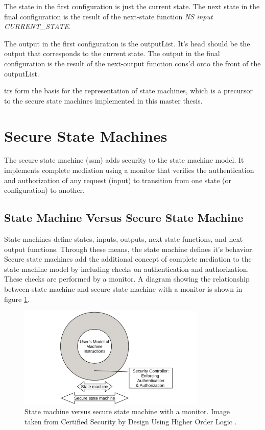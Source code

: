\documentclass[../../main/main.tex]{subfiles}
\begin{document}
The state in the first configuration is just the current state.  The next state in the final configuration is the result of the next-state function \textit{NS input CURRENT_STATE}.

The output in the first configuration is the outputList.  It's head should be the output that corresponds to the current state.  The output in the final configuration is the result of the next-output function cons'd onto the front of the outputList.

\glspl{tr} form the basis for the  representation of state machines, which is a precursor to the secure state machines implemented in this master thesis.  


\section{Secure State Machines}\label{sec:ssm}
The secure state machine (\gls{ssm}) adds security to the state machine model.  It implements complete mediation using a monitor that verifies the authentication and authorization of any request (input) to transition from one state (or configuration) to another.   

\subsection{State Machine Versus Secure State Machine}
State machines define states, inputs, outputs, next-state functions, and next-output functions.  Through these means, the state machine defines it's behavior.  Secure state machines add the additional concept of complete mediation to the state machine model by including checks on authentication and authorization.  These checks are performed by a monitor.  A diagram showing the relationship between state machine and secure state machine with a monitor is shown in figure \ref{smVSssm}.  

\begin{figure}[!h!]
\centering
\includegraphics[width=0.8\textwidth]{../figures/smVSssm}
\caption{\label{smVSssm} State machine versus secure state machine with a monitor.  Image taken from Certified Security by Design Using Higher Order Logic \cite{certmanual}.}
\end{figure}
\end{document}
